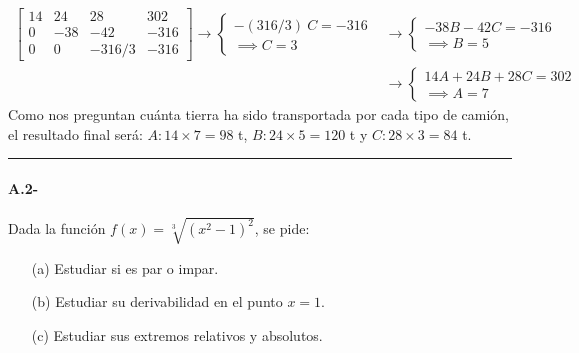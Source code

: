 \begin{align*}
\left [ \begin{array}{ccc|c}
    14 &24&28&302  \\
    0 & -38&-42&-316   \\
    0& 0& -316/3 &-316
\end{array} \right ] \longrightarrow \left \{ \begin{array}{c}
     -(316/3) \ C=-316  \\
     \implies C=3
\end{array} \right . &\longrightarrow \left \{ \begin{array}{c}
     -38B-42C=-316  \\
     \implies B=5
\end{array} \right .\\ &\longrightarrow \left \{ \begin{array}{c}
     14A+24B+28C=302  \\
     \implies A=7 
\end{array} \right .
\end{align*}
Como nos preguntan cuánta tierra ha sido transportada por cada tipo de camión, el resultado final será: $A: 14\times 7=98$ t, $B: 24\times 5=120$ t y $C: 28\times 3=84$ t.\\

\noindent\rule{\textwidth}{0.5pt}
\begin{mybox}
    \paragraph{A.2-} Dada la función $f(x)=\sqrt[3]{(x^2-1)^2}$, se pide:
    \begin{enumerate}
        \item[(a)] Estudiar si es par o impar.
        \item[(b)] Estudiar su derivabilidad en el punto $x=1$.
        \item[(c)] Estudiar sus extremos relativos y absolutos.
    \end{enumerate}
\end{mybox}

